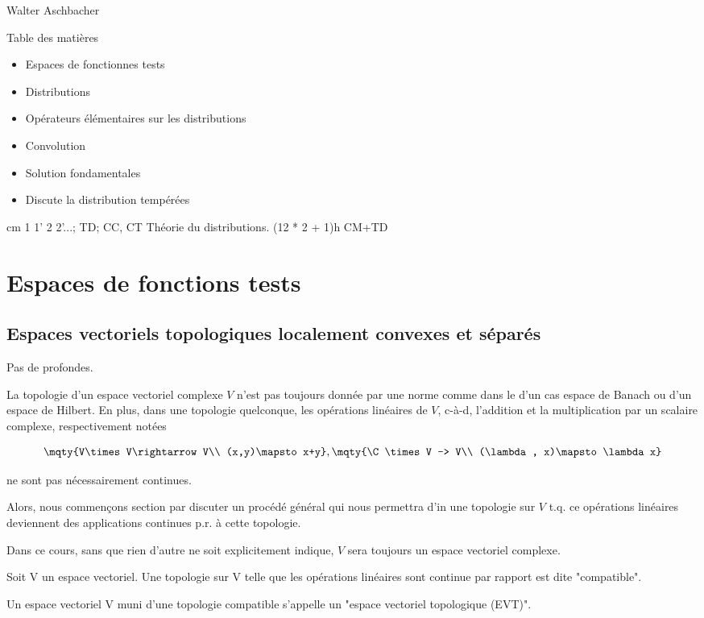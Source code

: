 Walter Aschbacher

Table des matières

	\begin{itemize}
		\item Espaces de fonctionnes tests
		\item Distributions
		\item Opérateurs élémentaires sur les distributions
		\item Convolution
		\item Solution fondamentales
		\item Discute la distribution tempérées
	\end{itemize}
	
cm 1 1' 2 2'...;
TD; CC, CT 
Théorie du distributions. (12 * 2 + 1)h CM+TD 




\chapter{Espaces de fonctions tests} %
\label{cha:espaces_de_fonctions_tests}

\section{Espaces vectoriels topologiques localement convexes et séparés} %
\label{sec:espaces_de_fonctions_tests}
Pas de profondes.

La topologie d'un espace vectoriel complexe $V$ n'est pas toujours donnée par une norme comme dans le d'un cas espace de Banach ou d'un espace de Hilbert.
En plus, dans une topologie quelconque, les opérations linéaires de $V$, c-à-d, l'addition et la multiplication par un scalaire complexe, respectivement notées 

\[
	\mqty{V\times V\rightarrow V\\
	(x,y)\mapsto x+y},
	\mqty{\C\times V -> V\\
	(\lambda, x)\mapsto \lambda x}
\]


ne sont pas nécessairement continues.

Alors, nous commençons section par discuter un procédé général qui nous permettra d'in une topologie sur $V$ t.q. ce opérations linéaires deviennent des applications continues p.r. à cette topologie.


Dans ce cours, sans que rien d'autre ne soit explicitement indique, $V$ sera toujours un espace vectoriel complexe.

\begin{definition}
	Soit V un espace vectoriel. Une topologie sur V telle que les opérations linéaires sont continue par rapport est dite "compatible".

	Un espace vectoriel V muni d'une topologie compatible s'appelle un "espace vectoriel topologique (EVT)".
\end{definition}

